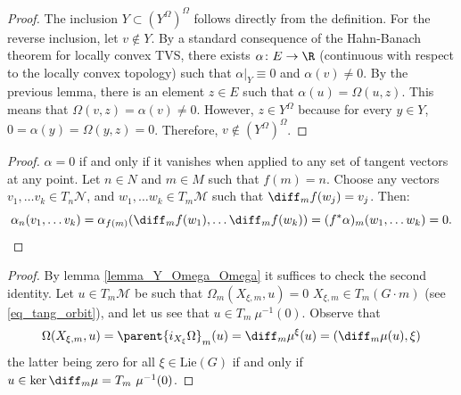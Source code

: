 \begin{proof}
    The inclusion \(Y \subset (Y^\Omega)^\Omega\) follows directly from the definition. For the reverse inclusion, let \(v \notin Y\). By a standard consequence of the Hahn-Banach theorem for locally convex TVS, there exists \(\alpha \colon E \to \R\) (continuous with respect to the locally convex topology) such that \(\alpha|_Y\equiv0\) and \(\alpha(v) \neq 0\). By the previous lemma, there is an element \(z \in E\) such that \(\alpha(u)=\Omega(u,z)\). This means that \(\Omega(v,z)=\alpha(v) \neq 0\). However, \(z \in Y^\Omega\) because for every \(y \in Y\), \(0=\alpha(y)=\Omega(y,z)=0\). Therefore, \(v \notin (Y^\Omega)^\Omega\).
\end{proof}

\begin{proof}
    \(\alpha=0\) if and only if it vanishes when applied to any set of tangent vectors at any point. Let \(n \in N\) and \(m \in M\) such that \(f(m)=n\). Choose any vectors \(v_1, \ldots v_k \in T_n\mathcal{N}\), and \(w_1, \ldots w_k \in T_m\mathcal{M}\) such that \(\diff_mf(w_j)=v_j\). Then:
    \[
    \alpha_n(v_1, \ldots v_k)=\alpha_{f(m)}(\diff_mf(w_1), \ldots \diff_mf(w_k))=(f^*\alpha)_m(w_1, \ldots w_k)=0.
    \]
\end{proof}

\begin{proof}
    By lemma \ref{lemma_Y_Omega_Omega} it suffices to check the second identity. Let \(u \in T_m \mathcal{M}\) be such that \(\Omega_m(X_{\xi, m}, u)=0\) \(X_{\xi, m} \in T_m(G  \cdot m)\) (see \eqref{eq_tang_orbit}), and let us see that \(u\in T_m \ \mu^{-1}(0)\). Observe that
    \[
    \Omega(X_{\xi, m}, u)=\parent{i_{X_\xi}\Omega}_m(u)=\diff_m \mu^\xi(u)=(\diff _m \mu (u), \xi)
    \]
    the latter being zero for all \(\xi \in \mathrm{Lie}(G)\) if and only if \(u\in \ker \diff_m\mu=T_m \ \mu^{-1}(0)\).
\end{proof}

